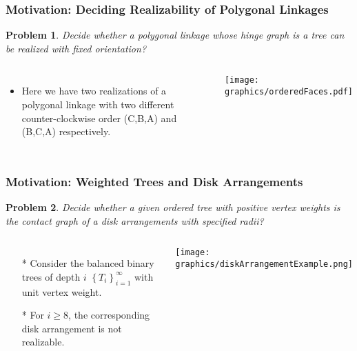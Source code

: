 \documentclass{beamer}
\newtheorem{prob}{Problem}
\begin{document}
\begin{frame}
\frametitle{Motivation: Deciding Realizability of Polygonal Linkages}
\begin{prob}
Decide whether a polygonal linkage whose hinge graph is a \textit{tree} can be realized with \textit{fixed orientation}?
\end{prob}
\begin{columns}[c] 
   \begin{itemize}
    \item Here we have two realizations of a polygonal linkage with two different counter-clockwise order (C,B,A) and (B,C,A) respectively.  
   \end{itemize}
    \begin{minipage}{\linewidth}
        \begin{center}
			\texttt{[image: graphics/orderedFaces.pdf]}
		\end{center}
    \end{minipage}
  \end{columns}
\end{frame}

\begin{frame}
\frametitle{Motivation: Weighted Trees and Disk Arrangements}
\begin{prob}
Decide whether a given ordered tree with positive vertex weights is the contact graph of a disk arrangements with specified radii?
\end{prob}
\begin{columns}[c] %
   \begin{itemize}
    \item[*] Consider the balanced binary trees of depth $i$ $\left\lbrace T_i \right\rbrace_{i=1}^\infty$ with unit vertex weight.
    \item[*] For $i \geq 8$, the corresponding disk arrangement is not realizable.
   \end{itemize}
    \begin{minipage}{\linewidth}
        \begin{center}
        \texttt{[image: graphics/diskArrangementExample.png]}
        \end{center}
    \end{minipage}
  \end{columns}
\end{frame}
\end{document}
